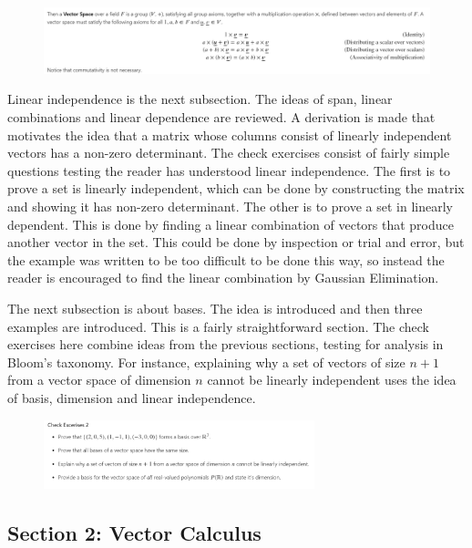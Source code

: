 \begin{figure}[h]
\centering
\includegraphics[width=\textwidth, frame]{./images/notebook1/1}
\end{figure}
Linear independence is the next subsection. The ideas of span, linear combinations and linear dependence are reviewed. A derivation is made that motivates the idea that a matrix whose columns consist of linearly independent vectors has a non-zero determinant. The check exercises consist of fairly simple questions testing the reader has understood linear independence. The first is to prove a set is linearly independent, which can be done by constructing the matrix and showing it has non-zero determinant. The other is to prove a set in linearly dependent. This is done by finding a linear combination of vectors that produce another vector in the set. This could be done by inspection or trial and error, but the example was written to be too difficult to be done this way, so instead the reader is encouraged to find the linear combination by Gaussian Elimination. 

The next subsection is about bases. The idea is introduced and then three examples are introduced. This is a fairly straightforward section. The check exercises here combine ideas from the previous sections, testing for analysis in Bloom's taxonomy. For instance, explaining why a set of vectors of size $n+1$ from a vector space of dimension $n$ cannot be linearly independent uses the idea of basis, dimension and linear independence.

\begin{figure}[h]
\centering
\includegraphics[width=0.7\textwidth, frame]{./images/notebook1/2}
\end{figure}

\subsection{Section 2: Vector Calculus}

